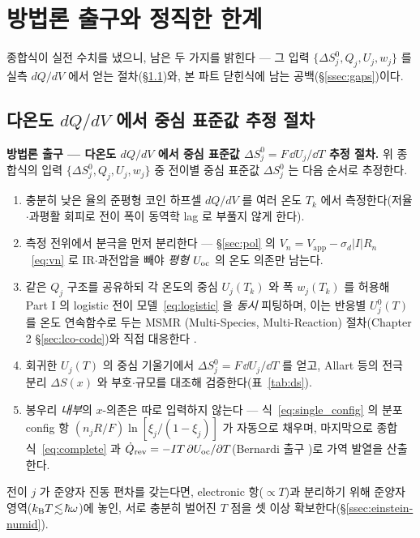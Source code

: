 \section{방법론 출구와 정직한 한계}\label{sec:method}

종합식이 실전 수치를 냈으니, 남은 두 가지를 밝힌다 --- 그 입력 $\{\Delta S^0_j,Q_j,U_j,w_j\}$ 를 실측
$dQ/dV$ 에서 얻는 절차(\S\ref{ssec:procedure})와, 본 파트 닫힌식에 남는 공백(\S\ref{ssec:gaps})이다.

\subsection{다온도 $dQ/dV$ 에서 중심 표준값 추정 절차}\label{ssec:procedure}
\begin{procedurebox}
\textbf{방법론 출구 --- 다온도 $dQ/dV$ 에서 중심 표준값 $\Delta S^0_j=F\,\dd U_j/\dd T$ 추정 절차.} 위 종합식의
입력 $\{\Delta S^0_j,Q_j,U_j,w_j\}$ 중 전이별 중심 표준값 $\Delta S^0_j$ 는 다음 순서로 추정한다.
\begin{enumerate}[leftmargin=1.8em,itemsep=2pt,topsep=2pt]
\item 충분히 낮은 율의 준평형 코인 하프셀 $dQ/dV$ 를 여러 온도 $T_k$ 에서 측정한다(저율$\cdot$과평활 회피로
전이 폭이 동역학 lag 로 부풀지 않게 한다).
\item 측정 전위에서 분극을 먼저 분리한다 --- \S\ref{sec:pol} 의 $V_n=V_\mathrm{app}-\sigma_d|I|R_n$~\eqref{eq:vn} 로
IR$\cdot$과전압을 빼야 \emph{평형} $U_{\mathrm{oc}}$ 의 온도 의존만 남는다.
\item 같은 $Q_j$ 구조를 공유하되 각 온도의 중심 $U_j(T_k)$ 와 폭 $w_j(T_k)$ 를 허용해 Part I 의 logistic
전이 모델~\eqref{eq:logistic} 을 \emph{동시} 피팅하며, 이는 반응별 $U_j^0(T)$ 를 온도 연속함수로 두는 MSMR
(Multi-Species, Multi-Reaction) 절차(Chapter 2 \S\ref{sec:lco-code})와 직접 대응한다 \cite{msmr_partI,msmr_partII}.
\item 회귀한 $U_j(T)$ 의 중심 기울기에서 $\Delta S^0_j=F\,\dd U_j/\dd T$ 를 얻고, Allart 등의 전극 분리
$\Delta S(x)$ \cite{allart2018} 와 부호$\cdot$규모를 대조해 검증한다(표~\ref{tab:ds}).
\item 봉우리 \emph{내부}의 $x$-의존은 따로 입력하지 않는다 --- 식~\eqref{eq:single_config} 의 분포 config 항
$(n_jR/F)\ln[\xi_j/(1-\xi_j)]$ 가 자동으로 채우며, 마지막으로 종합식~\eqref{eq:complete} 과
$\dot Q_{\mathrm{rev}}=-IT\,\partial U_{\mathrm{oc}}/\partial T$(Bernardi 출구 \cite{bernardi1985})로 가역 발열을 산출한다.
\end{enumerate}
전이 $j$ 가 준양자 진동 편차를 갖는다면, electronic 항($\propto T$)과 분리하기 위해 준양자 영역($k_{\mathrm B}
T\!\lesssim\!\hbar\omega$)에 놓인, 서로 충분히 벌어진 $T$ 점을 셋 이상 확보한다(\S\ref{ssec:einstein-numid}).
\end{procedurebox}

